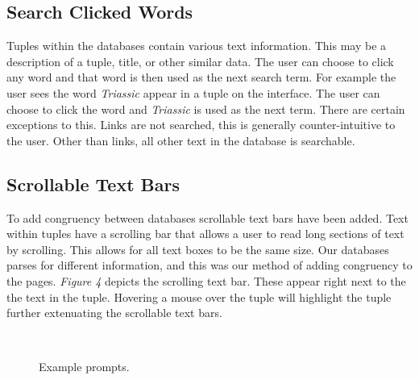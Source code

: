 \documentclass{sig-alternate-05-2015}
\begin{document}
 \subsection{Search Clicked Words }
  Tuples within the databases contain various text information. This may be a description of a tuple, title, or other similar data. The user can choose to click any word and that word is then used as the next search term. For example the user sees the word \textit{Triassic} appear in a tuple on the interface. The user can choose to click the word and \textit{Triassic} is used as the next term. There are certain exceptions to this. Links are not searched, this is generally counter-intuitive to the user. Other than links, all other text in the database is searchable. 
  
  \subsection{Scrollable Text Bars  }
  To add congruency between databases scrollable text bars have been added. Text within tuples have a scrolling bar that allows a user to read long sections of text by scrolling. This allows for all text boxes to be the same size. Our databases parses for different information, and this was our method of adding congruency to the pages. \textit{Figure 4} depicts the scrolling text bar. These appear right next to the the text in the tuple. Hovering a mouse over the tuple will highlight the tuple further extenuating the scrollable text bars. 
  
    ~
\begin{figure}[h]
\center
{}
\caption{Example prompts.}
\center
\end{figure}
~
 
\end{document}
